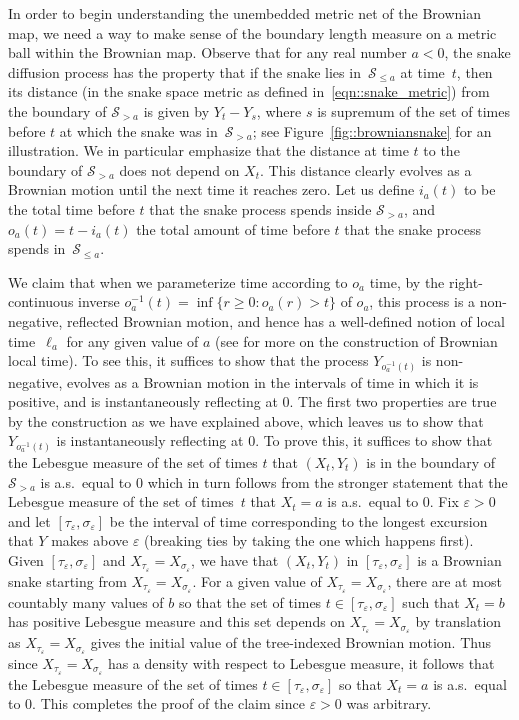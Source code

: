 \documentclass[10pt]{amsart}
\let\mathcal\mathscr
\let\epsilon\varepsilon
\theoremstyle{plain}
\numberwithin{theorem}{section}
\theoremstyle{definition}
\newcommand{\snake}{{\mathcal S}}
\begin{document}
In order to begin understanding the unembedded metric net of the Brownian map, we need a way to make sense of the boundary length measure on a metric ball within the Brownian map. Observe that for any real number $a < 0$, the snake diffusion process has the property that if the snake lies in~$\snake_{\leq a}$ at time~$t$, then its distance (in the snake space metric as defined in~\eqref{eqn::snake_metric}) from the boundary of $\snake_{>a}$ is given by $Y_t - Y_s$, where $s$ is supremum of the set of times before $t$ at which the snake was in~$\snake_{>a}$; see Figure~\ref{fig::browniansnake} for an illustration. We in particular emphasize that the distance at time $t$ to the boundary of $\snake_{>a}$ does not depend on $X_t$. This distance clearly evolves as a Brownian motion until the next time it reaches zero. Let us define $i_a(t)$ to be the total time before $t$ that the snake process spends inside $\snake_{>a}$, and $o_a(t) = t - i_a(t)$ the total amount of time before $t$ that the snake process spends in~$\snake_{\leq a}$.

We claim that when we parameterize time according to $o_a$ time, \ie by the right-continuous inverse $o_a^{-1}(t) = \inf\{r \geq 0 : o_a(r) > t\}$ of $o_a$, this process is a non-negative, reflected Brownian motion, and hence has a well-defined notion of local time~$\ell_a$ for any given value of $a$ (see \cite[Chap.\,VI]{ry99martingales} for more on the construction of Brownian local time). To see this, it suffices to show that the process $Y_{o_a^{-1}(t)}$ is non-negative, evolves as a Brownian motion in the intervals of time in which it is positive, and is instantaneously reflecting at $0$. The first two properties are true by the construction as we have explained above, which leaves us to show that $Y_{o_a^{-1}(t)}$ is instantaneously reflecting at $0$. To prove this, it suffices to show that the Lebesgue measure of the set of times $t$ that $(X_t,Y_t)$ is in the boundary of $\snake_{> a}$ is a.s.\ equal to $0$ which in turn follows from the stronger statement that the Lebesgue measure of the set of times~$t$ that $X_t = a$ is a.s.\ equal to $0$. Fix $\epsilon > 0$ and let $[\tau_\epsilon,\sigma_\epsilon]$ be the interval of time corresponding to the longest excursion that $Y$ makes above $\epsilon$ (breaking ties by taking the one which happens first). Given $[\tau_\epsilon,\sigma_\epsilon]$ and $X_{\tau_\epsilon} = X_{\sigma_\epsilon}$, we have that $(X_t,Y_t)$ in $[\tau_\epsilon,\sigma_\epsilon]$ is a Brownian snake starting from $X_{\tau_\epsilon} = X_{\sigma_\epsilon}$. For a given value of $X_{\tau_\epsilon} = X_{\sigma_\epsilon}$, there are at most countably many values of $b$ so that the set of times $t \in [\tau_\epsilon,\sigma_\epsilon]$ such that $X_t = b$ has positive Lebesgue measure and this set depends on $X_{\tau_\epsilon} = X_{\sigma_\epsilon}$ by translation as $X_{\tau_\epsilon} = X_{\sigma_\epsilon}$ gives the initial value of the tree-indexed Brownian motion. Thus since $X_{\tau_\epsilon} = X_{\sigma_\epsilon}$ has a density with respect to Lebesgue measure, it follows that the Lebesgue measure of the set of times $t \in [\tau_\epsilon,\sigma_\epsilon]$ so that $X_t = a$ is a.s.\ equal to $0$. This completes the proof of the claim since $\epsilon > 0$ was arbitrary.
\end{document}

